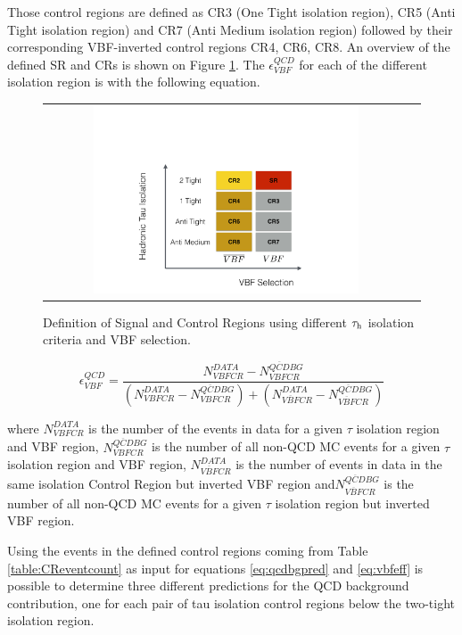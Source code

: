 Those  control regions are defined as CR3 (One Tight isolation region), CR5  (Anti Tight isolation region) and CR7 (Anti Medium isolation region) followed by their corresponding VBF-inverted control regions CR4, CR6, CR8. An overview of the defined SR and CRs is shown on Figure \ref{fig:crs}. The $\epsilon^{QCD}_{VBF}$ for each of the different \hadtau isolation region is with the following equation.

\begin{figure}[tbh!]
	\centering
	\begin{tabular}{cc}
		\includegraphics[width=0.75\textwidth]{PLOTS/diTauHadLSotherPlots/controlregions.pdf}
	\end{tabular}
	\caption{Definition of Signal and Control Regions using different $\tau_{\text{h}}$ isolation criteria and VBF selection.}
	\label{fig:crs}
\end{figure}

\begin{equation}
\epsilon^{QCD}_{VBF} = \frac {N^{DATA}_{VBF CR} - N^{\overline{QCD} BG}_{VBFCR}}{\left( N^{DATA}_{VBFCR} - N^{\overline{QCD} BG}_{VBFCR} \right) + \left( N^{DATA}_{\overline{VBF}CR} - N^{\overline{QCD} BG}_{\overline{VBF}CR} \right) }
\label{eq:vbfeff}
\end{equation}

where $N^{DATA}_{VBF CR}$ is the number of the events in data for a given $ \tau $ isolation region and VBF region, $N^{\overline{QCD} BG}_{VBFCR}$ is the number of all non-QCD MC events for a given $ \tau $ isolation region and VBF region, $N^{DATA}_{\overline{VBF}CR}$ is the number of events in data in the same isolation Control Region but inverted VBF region and$N^{\overline{QCD} BG}_{\overline{VBF}CR}$ is the number of all non-QCD MC events for a given $ \tau $ isolation region but inverted VBF region.

Using the events in the defined control regions coming from Table \ref{table:CReventcount} as input for equations \ref{eq:qcdbgpred} and \ref{eq:vbfeff} is possible to determine three different predictions for the QCD background contribution, one for each pair of tau isolation control regions below the two-tight isolation region.

